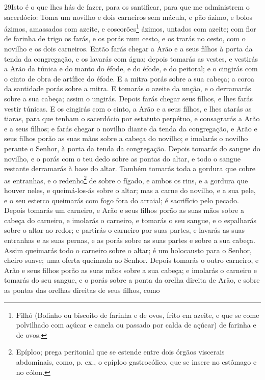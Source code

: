 \lettrine{29} Isto é o que lhes hás de fazer, para os
santificar, para que me administrem o sacerdócio: Toma um novilho e
dois carneiros sem mácula, e pão ázimo, e bolos ázimos,
amassados com azeite, e coscorões\footnote{Filhó (Bolinho ou
biscoito de farinha e de ovos, frito em azeite, e que se come
polvilhado com açúcar e canela ou passado por calda de açúcar) de
farinha e de ovos.} ázimos, untados com azeite; com flor de farinha
de trigo os farás, e os porás num cesto, e os trarás no cesto,
com o novilho e os dois carneiros. Então farás chegar a Arão e a
seus filhos à porta da tenda da congregação, e os lavarás com água;
depois tomarás as vestes, e vestirás a Arão da túnica e do manto
do éfode, e do éfode, e do peitoral; e o cingirás com o cinto de
obra de artífice do éfode. E a mitra porás sobre a sua cabeça; a
coroa da santidade porás sobre a mitra. E tomarás o azeite da
unção, e o derramarás sobre a sua cabeça; assim o ungirás.
Depois farás chegar seus filhos, e lhes farás vestir túnicas.
E os cingirás com o cinto, a Arão e a seus filhos, e lhes atarás
as tiaras, para que tenham o sacerdócio por estatuto perpétuo, e
consagrarás a Arão e a seus filhos; e farás chegar o novilho
diante da tenda da congregação, e Arão e seus filhos porão as suas
mãos sobre a cabeça do novilho; e imolarás o novilho perante
o Senhor, à porta da tenda da congregação. Depois tomarás do
sangue do novilho, e o porás com o teu dedo sobre as pontas do
altar, e todo o sangue restante derramarás à base do altar.
Também tomarás toda a gordura que cobre as entranhas, e o
redenho\footnote{Epíploo; prega peritonial que se estende entre dois
órgãos viscerais abdominais, como, p. ex., o epíploo gastrocólico,
que se insere no estômago e no cólon.} de sobre o fígado, e ambos os
rins, e a gordura que houver neles, e queimá-los-ás sobre o altar;
mas a carne do novilho, e a sua pele, e o seu esterco
queimarás com fogo fora do arraial; é sacrifício pelo pecado.
Depois tomarás um carneiro, e Arão e seus filhos porão as
suas mãos sobre a cabeça do carneiro, e imolarás o carneiro,
e tomarás o seu sangue, e o espalharás sobre o altar ao redor;
e partirás o carneiro por suas partes, e lavarás as suas
entranhas e as suas pernas, e as porás sobre as suas partes e sobre
a sua cabeça. Assim queimarás todo o carneiro sobre o altar;
é um holocausto para o Senhor, cheiro suave; uma oferta queimada ao
Senhor. Depois tomarás o outro carneiro, e Arão e seus filhos
porão as suas mãos sobre a sua cabeça; e imolarás o carneiro
e tomarás do seu sangue, e o porás sobre a ponta da orelha direita
de Arão, e sobre as pontas das orelhas direitas de seus filhos, como
